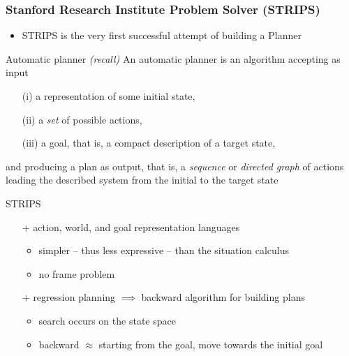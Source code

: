 \documentclass[presentation]{beamer}\mode<presentation>{\usetheme{AMSBolognaFC}}
\begin{document}
\begin{frame}[allowframebreaks]
\frametitle{Stanford Research Institute Problem Solver (STRIPS)}

\begin{itemize}
    \item STRIPS is the very first successful attempt of building a Planner
\end{itemize}


\begin{block}{Automatic planner \textit{(recall)}}
    An \alert{automatic planner} is an algorithm accepting as input
    \begin{itemize}
        \item[(i)] a representation of some \alert{initial state},
        \item[(ii)] a \emph{set} of possible \alert{actions},
        \item[(iii)] a \alert{goal}, that is, a compact description of a target state,
    \end{itemize}
    and producing a \alert{plan} as output, that is, a \emph{sequence} or \emph{directed graph} of actions leading the described system from the initial to the target state

\end{block}

\vfill

\begin{block}{STRIPS}
    \begin{itemize}
        \item[+] action, world, and goal \alert{representation languages}
        \begin{itemize}
            \item simpler -- thus less expressive -- than the situation calculus
            \item no frame problem
        \end{itemize}
        \item[+] \alert{regression} planning $\implies$ \alert{backward} algorithm for building plans
        \begin{itemize}
            \item search occurs on the \alert{state space}
            \item backward $\approx$ starting from the goal, move towards the initial goal
        \end{itemize}
    \end{itemize}
\end{block}

\end{frame}
\end{document}

